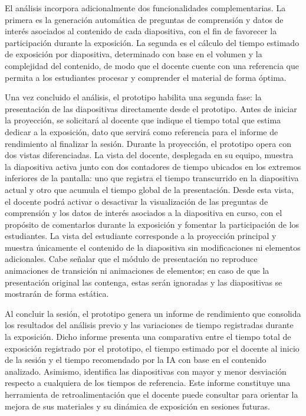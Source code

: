 \documentclass[11pt]{article}
\begin{document}
El análisis incorpora adicionalmente dos funcionalidades complementarias. La primera es la generación automática de preguntas de comprensión y datos de interés asociados al contenido de cada diapositiva, con el fin de favorecer la participación durante la exposición. La segunda es el cálculo del tiempo estimado de exposición por diapositiva, determinado con base en el volumen y la complejidad del contenido, de modo que el docente cuente con una referencia que permita a los estudiantes procesar y comprender el material de forma óptima.

Una vez concluido el análisis, el prototipo habilita una segunda fase: la presentación de las diapositivas directamente desde el prototipo. Antes de iniciar la proyección, se solicitará al docente que indique el tiempo total que estima dedicar a la exposición, dato que servirá como referencia para el informe de rendimiento al finalizar la sesión. Durante la proyección, el prototipo opera con dos vistas diferenciadas. La vista del docente, desplegada en su equipo, muestra la diapositiva activa junto con dos contadores de tiempo ubicados en los extremos inferiores de la pantalla: uno que registra el tiempo transcurrido en la diapositiva actual y otro que acumula el tiempo global de la presentación. Desde esta vista, el docente podrá activar o desactivar la visualización de las preguntas de comprensión y los datos de interés asociados a la diapositiva en curso, con el propósito de comentarlos durante la exposición y fomentar la participación de los estudiantes. La vista del estudiante corresponde a la proyección principal y muestra únicamente el contenido de la diapositiva sin modificaciones ni elementos adicionales. Cabe señalar que el módulo de presentación no reproduce animaciones de transición ni animaciones de elementos; en caso de que la presentación original las contenga, estas serán ignoradas y las diapositivas se mostrarán de forma estática.

Al concluir la sesión, el prototipo genera un informe de rendimiento que consolida los resultados del análisis previo y las variaciones de tiempo registradas durante la exposición. Dicho informe presenta una comparativa entre el tiempo total de exposición registrado por el prototipo, el tiempo estimado por el docente al inicio de la sesión y el tiempo recomendado por la IA con base en el contenido analizado. Asimismo, identifica las diapositivas con mayor y menor desviación respecto a cualquiera de los tiempos de referencia. Este informe constituye una herramienta de retroalimentación que el docente puede consultar para orientar la mejora de sus materiales y su dinámica de exposición en sesiones futuras.
\end{document}
